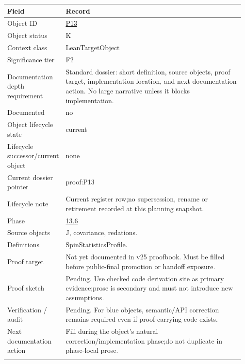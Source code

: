 \begin{longtable}{L{0.16\linewidth} L{0.81\linewidth}}
\hline
\textbf{Field} & \textbf{Record}\\
\hline
Object ID & \hyperlink{object-row-P13}{P13}\\
\hline\addlinespace[0.20em]
Object status & K\\
\hline\addlinespace[0.20em]
Context class & LeanTargetObject\\
\hline\addlinespace[0.20em]
Significance tier & F2\\
\hline\addlinespace[0.20em]
Documentation depth requirement & Standard dossier: short definition, source objects, proof target, implementation location, and next documentation action. No large narrative unless it blocks implementation.\\
\hline\addlinespace[0.20em]
Documented & no\\
\hline\addlinespace[0.20em]
Object lifecycle state & current\\
\hline\addlinespace[0.20em]
Lifecycle successor/\allowbreak{}current object & none\\
\hline\addlinespace[0.20em]
Current dossier pointer & proof:P13\\
\hline\addlinespace[0.20em]
Lifecycle note & Current register row;\newline no supersession, rename or retirement recorded at this planning snapshot.\\
\hline\addlinespace[0.20em]
Phase & \hyperlink{phase-row-13-6}{13.6}\\
\hline\addlinespace[0.20em]
Source objects & J, covariance, redations.\\
\hline\addlinespace[0.20em]
Definitions & SpinStatisticsProfile.\\
\hline\addlinespace[0.20em]
Proof target & Not yet documented in v25 proofbook. Must be filled before public-final promotion or handoff exposure.\\
\hline\addlinespace[0.20em]
Proof sketch & Pending. Use checked code derivation site as primary evidence;\newline prose is secondary and must not introduce new assumptions.\\
\hline\addlinespace[0.20em]
Verification /\allowbreak{} audit & Pending. For blue objects, semantic/\allowbreak{}API correction remains required even if proof-carrying code exists.\\
\hline\addlinespace[0.20em]
Next documentation action & Fill during the object's natural correction/\allowbreak{}implementation phase;\newline do not duplicate in phase-local prose.\\
\hline\addlinespace[0.20em]
\end{longtable}
